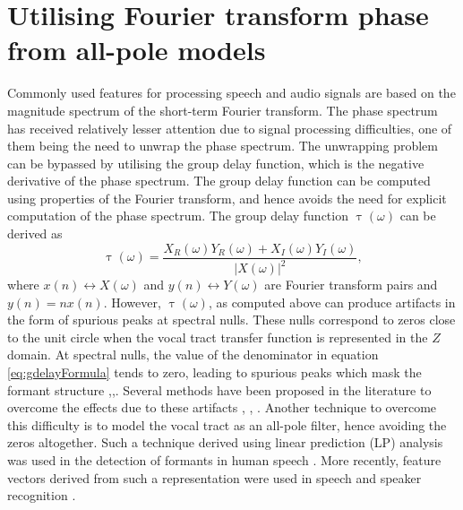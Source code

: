 \documentclass[a4paper]{article}
\begin{document}
\section{Utilising Fourier transform phase from all-pole models}
\label{sec:gdReview}

Commonly used features for processing speech and audio signals are based on the
magnitude spectrum of the short-term Fourier transform. The phase spectrum has
received relatively lesser attention due to signal processing difficulties, one
of them being the need to unwrap the phase spectrum. The unwrapping problem can
be bypassed by utilising the group delay function, which is the negative
derivative of the phase spectrum. The group delay function can be computed using
properties of the Fourier transform, and hence avoids the need for explicit
computation of the phase spectrum. The group delay function
$\uptau(\omega)$ can be derived as \cite{gdDeriv}
\begin{equation}
\uptau(\omega) = \frac{X_R(\omega) Y_R(\omega) + X_I(\omega)
Y_I(\omega)}{|X(\omega)|^2},
\label{eq:gdelayFormula}
\end{equation}
where $x(n) \leftrightarrow X(\omega)$ and $y(n) \leftrightarrow Y(\omega)$ are
Fourier transform pairs and $y(n) = n x(n)$.  However, $\uptau(\omega)$, as
computed above can produce artifacts in the form of spurious peaks at spectral
nulls. These nulls correspond to zeros close to the unit circle when the vocal
tract transfer function is represented in the $Z$ domain.  At spectral nulls,
the value of the denominator in equation \ref{eq:gdelayFormula} tends to zero,
leading to spurious peaks which mask the formant structure
\cite{hema},\cite{hemaSigProc1989},\cite{chirpGD}.  Several methods have been
proposed in the literature to overcome the effects due to these artifacts
\cite{modgdf}, \cite{chirpGD}, \cite{productSpectrum}. Another technique to
overcome this difficulty is to model the vocal tract as an all-pole filter,
hence avoiding the zeros altogether. Such a technique derived using linear
prediction (LP) analysis was used in the detection of formants in human speech
\cite{yegnaFormant}. More recently, feature vectors derived from such a representation 
were used in speech \cite{drugman} and speaker recognition \cite{padman}. 
\end{document}
